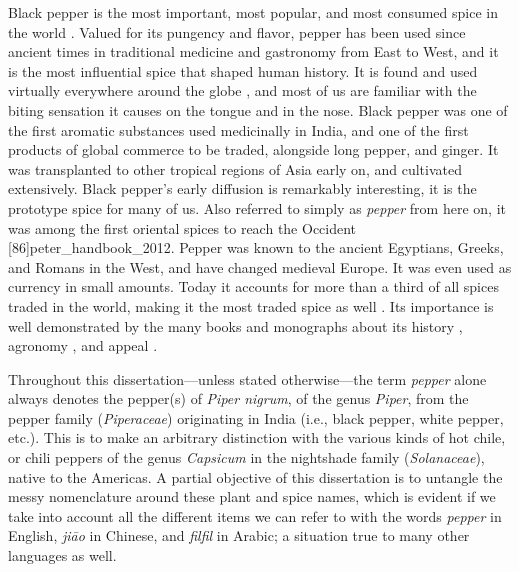 Black pepper is the most important, most popular, and most consumed spice in the world \autocite[721]{mabberley_mabberleys_2017}. Valued for its pungency and flavor, pepper has been used since ancient times in traditional medicine and gastronomy from East to West, and it is the most influential spice that shaped human history. It is found and used virtually everywhere around the globe \autocite[253]{hill_contemporary_2004}, and most of us are familiar with the biting sensation it causes on the tongue and in the nose. Black pepper was one of the first aromatic substances used medicinally in India, and one of the first products of global commerce to be traded, alongside long pepper, and ginger. It was transplanted to other tropical regions of Asia early on, and cultivated extensively. Black pepper's early diffusion is remarkably interesting, it is the prototype spice for many of us. Also referred to simply as \textit{pepper} from here on, it was among the first oriental spices to reach the Occident [86]{peter_handbook_2012}. Pepper was known to the ancient Egyptians, Greeks, and Romans in the West, and have changed medieval Europe. It was even used as currency in small amounts. Today it accounts for more than a third of all spices traded in the world, making it the most traded spice as well \autocite{ravindran_piper_2017}. Its importance is well demonstrated by the many books and monographs about its history \autocite[see][]{shaffer_pepper_2013,wernick_pepper_2014}, agronomy \autocite[see][]{ravindran_black_2000,nair_geography_2020}, and appeal \autocite[see][]{de_kerros_pepper_2016,barth_pepper_2019}.

\begin{note}
    Throughout this dissertation---unless stated otherwise---the term \textit{pepper} alone always denotes the pepper(s) of \textit{Piper nigrum}, of the genus \textit{Piper}, from the pepper family (\textit{Piperaceae}) originating in India (i.e., black pepper, white pepper, etc.). This is to make an arbitrary distinction with the various kinds of hot chile, or chili peppers of the genus \textit{Capsicum} in the nightshade family (\textit{Solanaceae}), native to the Americas. A partial objective of this dissertation is to untangle the messy nomenclature around these plant and spice names, which is evident if we take into account all the different items we can refer to with the words \textit{pepper} in English, \textit{jiāo} in Chinese, and \textit{filfil} in Arabic; a situation true to many other languages as well. 
    \end{note}


